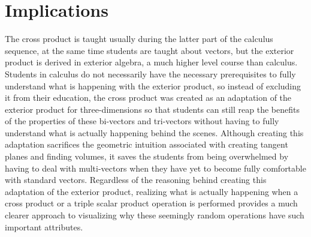 \documentclass{amsart}
\begin{document}
	\section{Implications} \label{implications}
		The cross product is taught usually during the latter part of the calculus sequence, at the same time students are taught about vectors, but the exterior product is derived in exterior algebra, a much higher level course than calculus. Students in calculus do not necessarily have the necessary prerequisites to fully understand what is happening with the exterior product, so instead of excluding it from their education, the cross product was created as an adaptation of the exterior product for three-dimensions so that students can still reap the benefits of the properties of these bi-vectors and tri-vectors without having to fully understand what is actually happening behind the scenes. Although creating this adaptation sacrifices the geometric intuition associated with creating tangent planes and finding volumes, it saves the students from being overwhelmed by having to deal with multi-vectors when they have yet to become fully comfortable with standard vectors. Regardless of the reasoning behind creating this adaptation of the exterior product, realizing what is actually happening when a cross product or a triple scalar product operation is performed provides a much clearer approach to visualizing why these seemingly random operations have such important attributes.
\end{document}
